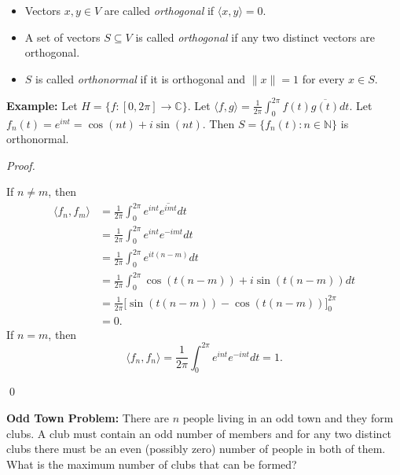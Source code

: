 \documentclass[12pt]{article}
\newenvironment{definition}[2][Definition]{\begin{trivlist}
\item[\hskip \labelsep {\bfseries #1}\hskip \labelsep {\bfseries #2}]}{\end{trivlist}}
\newenvironment{sol}
    {\emph{Proof.}
    }
    {
    \qed
    }
\begin{document}
\begin{definition}{4} \textit{ }
\begin{itemize}
    \item Vectors $x,y \in V$ are called \textit{orthogonal} if $\langle x, y \rangle = 0$.
    
    \item A set of vectors $S \subseteq V$ is called \textit{orthogonal} if any two distinct vectors are orthogonal.
    
    \item $S$ is called \textit{orthonormal} if it is orthogonal and $\lVert x \rVert = 1$ for every $x \in S$.
\end{itemize}
\end{definition}

\noindent\textbf{Example:} Let $H = \{f : [0,2\pi] \to \mathbb{C}\}$. Let $\langle f, g \rangle = \frac{1}{2\pi} \int_0^{2\pi}f(t)\overline{g(t)}dt$. Let $f_n(t) = e^{int} = \cos(nt) + i\sin(nt)$. Then $S = \{ f_n(t) : n \in \mathbb{N}\}$ is orthonormal.

\begin{sol}
If $n \neq m$, then \begin{align*}
    \langle f_n, f_m \rangle &= \frac{1}{2\pi} \int_0^{2\pi}e^{int}\overline{e^{imt}}dt \\
    &= \frac{1}{2\pi} \int_0^{2\pi}e^{int}e^{-imt}dt \\
    &= \frac{1}{2\pi} \int_0^{2\pi}e^{it(n-m)}dt \\
    &= \frac{1}{2\pi} \int_0^{2\pi} \cos(t(n-m)) + i\sin(t(n-m))dt \\
    &= \frac{1}{2\pi} \big[ \sin(t(n-m)) - \cos(t(n-m)) \big]_0^{2\pi} \\
    &= 0.
\end{align*} If $n = m$, then $$\langle f_n, f_n \rangle = \frac{1}{2\pi} \int_0^{2\pi} e^{int}e^{-int}dt = 1.$$
\end{sol}

\vspace{1em}

\textbf{Odd Town Problem:} There are $n$ people living in an odd town and they form clubs. A club must contain an odd number of members and for any two distinct clubs there must be an even (possibly zero) number of people in both of them. What is the maximum number of clubs that can be formed?
\end{document}
